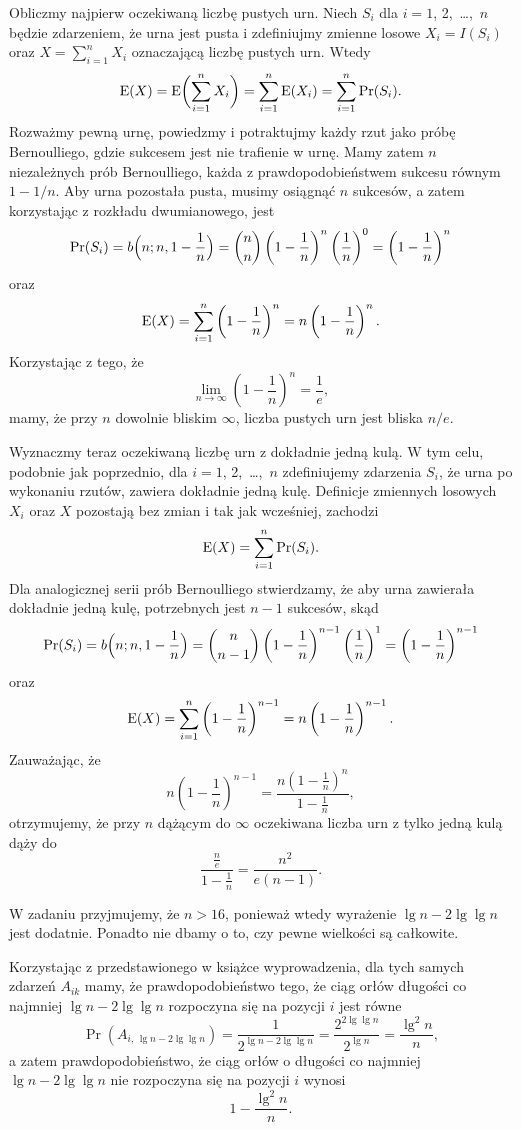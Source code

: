 \exercise %
Obliczmy najpierw oczekiwaną liczbę pustych urn. Niech $S_i$ dla $i=1$, 2,~\dots,~$n$ będzie zdarzeniem, że  urna jest pusta i zdefiniujmy zmienne losowe $X_i=I(S_i)$ oraz $X=\sum_{i=1}^nX_i$ oznaczającą liczbę pustych urn. Wtedy
\[
	\operatorname{E}(X) = \operatorname{E}\biggl(\sum_{i=1}^nX_i\biggr) = \sum_{i=1}^n\operatorname{E}(X_i) = \sum_{i=1}^n\Pr(S_i).
\]
Rozważmy pewną urnę, powiedzmy  i potraktujmy każdy rzut jako próbę Bernoulliego, gdzie sukcesem jest nie trafienie w  urnę. Mamy zatem $n$ niezależnych prób Bernoulliego, każda z prawdopodobieństwem sukcesu równym $1-1/n$. Aby  urna pozostała pusta, musimy osiągnąć $n$ sukcesów, a zatem korzystając z rozkładu dwumianowego, jest
\[
	\Pr(S_i) = b\Bigl(n;n,1-\frac{1}{n}\Bigr) = \binom{n}{n}\left(1-\frac{1}{n}\right)^n\left(\frac{1}{n}\right)^0 = \left(1-\frac{1}{n}\right)^n
\]
oraz
\[
	\operatorname{E}(X) = \sum_{i=1}^n\left(1-\frac{1}{n}\right)^n = n\left(1-\frac{1}{n}\right)^n.
\]
Korzystając z tego, że
\[
	\lim_{n\to\infty}\left(1-\frac{1}{n}\right)^n = \frac{1}{e},
\]
mamy, że przy $n$ dowolnie bliskim $\infty$, liczba pustych urn jest bliska $n/e$.

Wyznaczmy teraz oczekiwaną liczbę urn z dokładnie jedną kulą. W tym celu, podobnie jak poprzednio, dla $i=1$, 2,~\dots,~$n$ zdefiniujemy zdarzenia $S_i$, że  urna po wykonaniu rzutów, zawiera dokładnie jedną kulę. Definicje zmiennych losowych $X_i$ oraz $X$ pozostają bez zmian i tak jak wcześniej, zachodzi
\[
	\operatorname{E}(X) = \sum_{i=1}^n\Pr(S_i).
\]
Dla analogicznej serii prób Bernoulliego stwierdzamy, że aby  urna zawierała dokładnie jedną kulę, potrzebnych jest $n-1$ sukcesów, skąd
\[
	\Pr(S_i) = b\Bigl(n;n,1-\frac{1}{n}\Bigr) = \binom{n}{n-1}\left(1-\frac{1}{n}\right)^{n-1}\left(\frac{1}{n}\right)^1 = \left(1-\frac{1}{n}\right)^{n-1}
\]
oraz
\[
	\operatorname{E}(X) = \sum_{i=1}^n\left(1-\frac{1}{n}\right)^{n-1} = n\left(1-\frac{1}{n}\right)^{n-1}.
\]
Zauważając, że
\[
	n\left(1-\frac{1}{n}\right)^{n-1} = \frac{n\left(1-\frac{1}{n}\right)^n}{1-\frac{1}{n}},
\]
otrzymujemy, że przy $n$ dążącym do $\infty$ oczekiwana liczba urn z tylko jedną kulą dąży do
\[
	\frac{\frac{n}{e}}{1-\frac{1}{n}} = \frac{n^2}{e(n-1)}.
\]

\exercise %
W zadaniu przyjmujemy, że $n>16$, ponieważ wtedy wyrażenie $\lg n-2\lg\lg n$ jest dodatnie. Ponadto nie dbamy o to, czy pewne wielkości są całkowite.

Korzystając z przedstawionego w książce wyprowadzenia, dla tych samych zdarzeń $A_{ik}$ mamy, że prawdopodobieństwo tego, że ciąg orłów długości co najmniej $\lg n-2\lg\lg n$ rozpoczyna się na pozycji $i$ jest równe
\[
	\Pr(A_{i,\,\lg n-2\lg\lg n}) = \frac{1}{2^{\lg n-2\lg\lg n}} = \frac{2^{2\lg\lg n}}{2^{\lg n}} = \frac{\lg^2n}{n},
\]
a zatem prawdopodobieństwo, że ciąg orłów o długości co najmniej $\lg n-2\lg\lg n$ nie rozpoczyna się na pozycji $i$ wynosi
\[
	1-\frac{\lg^2n}{n}.
\]

